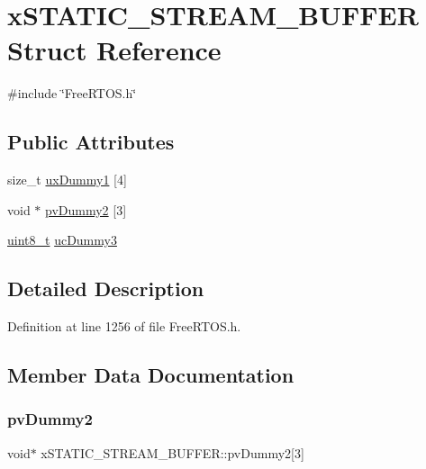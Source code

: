 \hypertarget{structxSTATIC__STREAM__BUFFER}{}\section{x\+S\+T\+A\+T\+I\+C\+\_\+\+S\+T\+R\+E\+A\+M\+\_\+\+B\+U\+F\+F\+ER Struct Reference}
\label{structxSTATIC__STREAM__BUFFER}


{\ttfamily \#include \char`\"{}Free\+R\+T\+O\+S.\+h\char`\"{}}

\subsection*{Public Attributes}
\begin{DoxyCompactItemize}
\item 
size\+\_\+t \hyperlink{structxSTATIC__STREAM__BUFFER_a9020496ea46d0d95451ed11b3193fa09}{ux\+Dummy1} \mbox{[}4\mbox{]}
\item 
void $\ast$ \hyperlink{structxSTATIC__STREAM__BUFFER_a7603bb483828c39906839c90c4e70fe9}{pv\+Dummy2} \mbox{[}3\mbox{]}
\item 
\hyperlink{stdint_8h_aba7bc1797add20fe3efdf37ced1182c5}{uint8\+\_\+t} \hyperlink{structxSTATIC__STREAM__BUFFER_a7a6df8a6f408f01b245c0c90732dea72}{uc\+Dummy3}
\end{DoxyCompactItemize}


\subsection{Detailed Description}


Definition at line 1256 of file Free\+R\+T\+O\+S.\+h.



\subsection{Member Data Documentation}
\mbox{\label{structxSTATIC__STREAM__BUFFER_a7603bb483828c39906839c90c4e70fe9}} 
\subsubsection{\texorpdfstring{pv\+Dummy2}{pvDummy2}}
{\footnotesize\ttfamily void$\ast$ x\+S\+T\+A\+T\+I\+C\+\_\+\+S\+T\+R\+E\+A\+M\+\_\+\+B\+U\+F\+F\+E\+R\+::pv\+Dummy2\mbox{[}3\mbox{]}}



